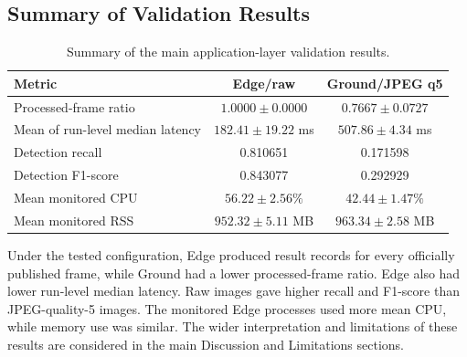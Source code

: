 \subsection{Summary of Validation Results}
\label{subsec:testing-detection-summary}

\begin{table}[H]
    \centering
    \caption{Summary of the main application-layer validation results.}
    \label{tab:application-validation-summary}
    \begin{tabular}{|l|c|c|}
        \hline
        Metric & Edge/raw & Ground/JPEG q5 \\ \hline
        Processed-frame ratio & $1.0000 \pm 0.0000$ & $0.7667 \pm 0.0727$ \\ \hline
        Mean of run-level median latency & $182.41 \pm 19.22$ ms & $507.86 \pm 4.34$ ms \\ \hline
        Detection recall & 0.810651 & 0.171598 \\ \hline
        Detection F1-score & 0.843077 & 0.292929 \\ \hline
        Mean monitored CPU & $56.22 \pm 2.56\%$ & $42.44 \pm 1.47\%$ \\ \hline
        Mean monitored RSS & $952.32 \pm 5.11$ MB & $963.34 \pm 2.58$ MB \\ \hline
    \end{tabular}
\end{table}

Under the tested configuration, Edge produced result records for every officially published frame, while Ground had a lower processed-frame ratio. Edge also had lower run-level median latency. Raw images gave higher recall and F1-score than JPEG-quality-5 images. The monitored Edge processes used more mean CPU, while memory use was similar. The wider interpretation and limitations of these results are considered in the main Discussion and Limitations sections.
